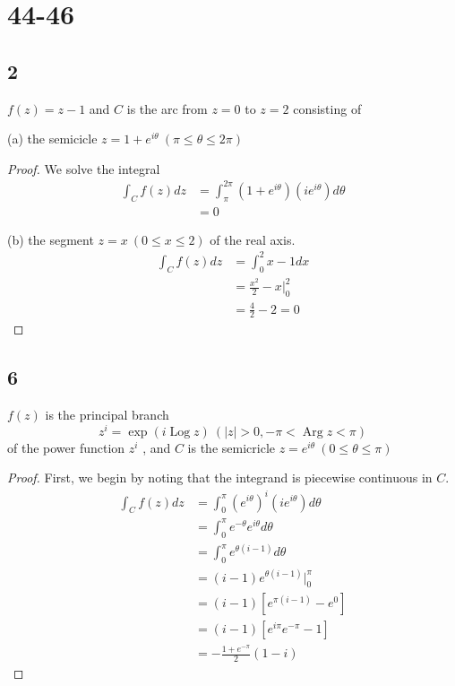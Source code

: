 \documentclass{article}
\DeclareMathOperator*{\Log}{Log}
\DeclareMathOperator*{\Arg}{Arg}
\begin{document}
\section*{44-46}
\subsection*{2}
$f(z) = z -1$ and $C$ is the arc from $z = 0$ to $z=2$ consisting of

(a) the semicicle $z = 1 + e^{i\theta} \ (\pi \leq \theta \leq 2\pi)$
\begin{proof}
    We solve the integral
    \begin{align*}
        \int_C f(z) dz & = \int_{\pi}^{2\pi} (1 + e^{i\theta})(ie^{i\theta})d\theta \\
                       & = 0
    \end{align*}

    (b) the segment $z = x \ (0 \leq x \leq 2)$ of the real axis.
    \begin{align*}
        \int_C f(z) dz & = \int_0^2 x -1 dx            \\
                       & = \frac{x^2}{2} -x \Big |_0^2 \\
                       & = \frac{4}{2} -2 = 0
    \end{align*}
\end{proof}
\subsection*{6}
$f(z)$ is the principal branch
$$z^i = \exp(i\Log z) \ (|z| > 0, -\pi < \Arg z < \pi)$$
of the power function $z^i$ , and $C$ is the semicricle
$z = e^{i\theta} \ (0 \leq \theta \leq \pi)$

\begin{proof}
    First, we begin by noting that the integrand is piecewise continuous in $C$.
    \begin{align*}
        \int_C f(z) dz & = \int_0^\pi (e^{i\theta})^i(ie^{i\theta}) d\theta \\
                       & = \int_0^\pi e^{-\theta}e^{i\theta} d\theta        \\
                       & = \int_0^\pi e^{\theta(i-1)} d\theta               \\
                       & = (i - 1)e^{\theta(i-1)} \Big |_0^\pi              \\
                       & = (i-1)[e^{\pi(i - 1)} - e^0]                      \\
                       & = (i-1)[e^{i\pi}e^{-\pi} -1]                       \\
                       & = -\frac{1 + e^{-\pi}}{2}(1-i)
    \end{align*}
\end{proof}
\end{document}
